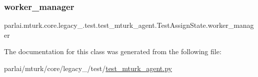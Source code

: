 \subsubsection{\texorpdfstring{worker\+\_\+manager}{worker\_manager}}
{\footnotesize\ttfamily parlai.\+mturk.\+core.\+legacy\+\_.\+test.\+test\+\_\+mturk\+\_\+agent.\+Test\+Assign\+State.\+worker\+\_\+manager}



The documentation for this class was generated from the following file\+:\begin{DoxyCompactItemize}
\item 
parlai/mturk/core/legacy\+\_/test/\hyperlink{legacy__2018_2test_2test__mturk__agent_8py}{test\+\_\+mturk\+\_\+agent.\+py}\end{DoxyCompactItemize}
